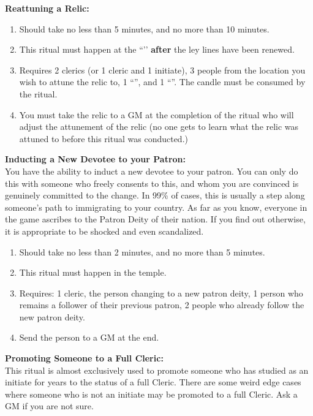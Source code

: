 \documentclass[green]{GL2020}
\begin{document}
\textbf{Reattuning a Relic:}
  \begin{enumerate}
    \item Should take no less than 5 minutes, and no more than 10 minutes.
    \item This ritual must happen at the ``\sLeyLinesNexus{}’’ \textbf{after} the ley lines have been renewed.
    \item Requires 2 clerics (or 1 cleric and 1 initiate), 3 people from the location you wish to attune the relic to, 1 ``\iRitualCandle{}'', and 1 ``\iTuningFork{}''.  The candle must be consumed by the ritual.
    \item You must take the relic to a GM at the completion of the ritual who will adjust the attunement of the relic (no one gets to learn what the relic was attuned to before this ritual was conducted.)
  \end{enumerate}
   
\textbf{Inducting a New Devotee to your Patron:}\\
You have the ability to induct a new devotee to your patron. You can only do this with someone who freely consents to this, and whom you are convinced is genuinely committed to the change. In 99\% of cases, this is usually a step along someone’s path to immigrating to your country. As far as you know, everyone in the game ascribes to the Patron Deity of their nation. If you find out otherwise, it is appropriate to be shocked and even scandalized. 
  \begin{enumerate}
    \item Should take no less than 2 minutes, and no more than 5 minutes.
    \item This ritual must happen in the temple.
    \item Requires: 1 cleric, the person changing to a new patron deity, 1 person who remains a follower of their previous patron, 2 people who already follow the new patron deity.
		\item Send the person to a GM at the end.
  \end{enumerate}
   
\textbf{Promoting Someone to a Full Cleric:}\\
This ritual is almost exclusively used to promote someone who has studied as an initiate for years to the status of a full Cleric. There are some weird edge cases where someone who is not an initiate may be promoted to a full Cleric. Ask a GM if you are not sure.
\end{document}
